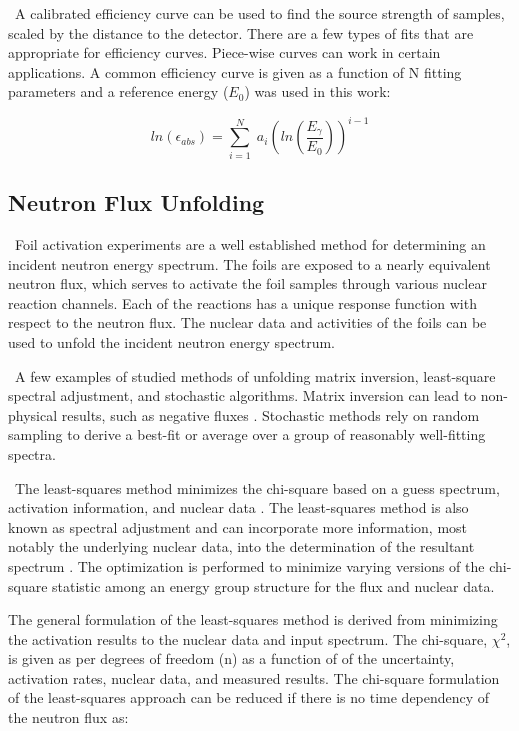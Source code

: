 \documentclass[journal]{IEEEtran}
\begin{document}
	\ A calibrated efficiency curve can be used to find the source strength of samples, scaled by the distance to the detector. 
There are a few types of fits that are appropriate for efficiency curves. 
Piece-wise curves can work in certain applications. %
A common efficiency curve is given as a function of N fitting parameters and a reference energy ($E_{0}$) was used in this work:
	
	\begin{equation} \label{eq:effa1}
    ln(\epsilon_{abs}) =   \sum_{i=1}^{N} \; a_{i} (ln(\dfrac{E_{\gamma}}{E_{0}}))^{i-1}
	\end{equation}
	
	\subsection{Neutron Flux Unfolding}
	\ Foil activation experiments are a well established method for determining an incident neutron energy spectrum. %
	The foils are exposed to a nearly equivalent
	neutron flux, which serves to activate the foil samples through various nuclear reaction channels. Each of the reactions has a unique response function with respect to
	the neutron flux. The nuclear data and activities of the foils can be used to unfold
	the incident neutron energy spectrum.

	\ A few examples of studied methods of unfolding matrix inversion, least-square spectral adjustment, and stochastic algorithms\cite{Reginatto2010}. 
Matrix inversion can lead to non-physical results, such as negative fluxes \cite{Reginatto2010}. 
Stochastic methods rely on random sampling to derive a best-fit or average over a group of reasonably well-fitting spectra\cite{Reginatto2010}. 
	
	\ The least-squares method minimizes the chi-square based on a guess spectrum, activation information, and nuclear data \cite{Perey1977}. 
The least-squares method is also known as spectral adjustment and can incorporate more information, most notably the underlying nuclear data, into the determination of the resultant spectrum \cite{Perey1977}.
The optimization is performed to minimize varying versions of the chi-square statistic among an energy group structure for the flux and nuclear data. 
	
	The general formulation of the least-squares method is derived from minimizing the activation results to the nuclear data and input spectrum\cite{Perey1977}. 
The chi-square, $\chi^{2}$, is given as per degrees of freedom (n) as a function of of the uncertainty, activation rates, nuclear data, and measured results. 
The chi-square formulation of the least-squares approach can be reduced if there is no time dependency of the neutron flux as:
	
\end{document}
